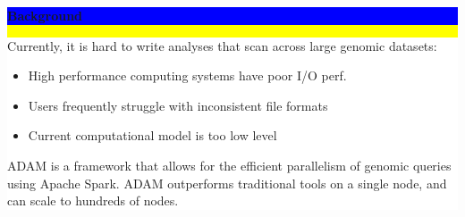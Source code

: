 \documentclass[11pt]{a0poster}
\begin{document}
\noindent\colorbox{Yellow}{
\begin{minipage}[t][2045pt][t]{\linewidth}

\noindent\begin{minipage}{0.025\linewidth}
\hfill
\pagebreak
\end{minipage}
\begin{minipage}{0.3\linewidth}
\vspace{75pt}
\colorbox{Blue}{
\begin{minipage}{\linewidth}
\vspace{25pt}
\begin{center}
\Huge \bf \color{White} Background
\end{center}
\vspace{10pt}
\end{minipage}
}
\colorbox{White}{
\begin{minipage}[t][600pt][t]{\linewidth}
\color{Blue}
\vspace{20pt}
\LARGE Currently, it is hard to write analyses that scan across large genomic
datasets:

\vspace{33pt}
\begin{itemize}
\item High performance computing systems have poor I/O perf.
\item Users frequently struggle with inconsistent file formats
\item Current computational model is too low level
\end{itemize}
\vspace{33pt}

ADAM is a framework that allows for the efficient parallelism of genomic queries
using Apache Spark. ADAM outperforms traditional tools on a single node, and
can scale to hundreds of nodes.
\hfill
\pagebreak
\end{minipage}
}


\end{minipage}
\end{minipage}}
\end{document}
